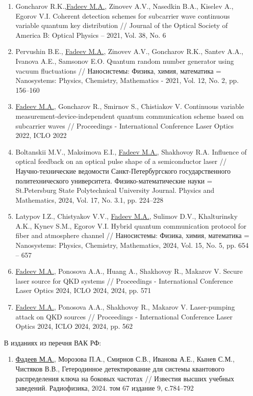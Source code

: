 \begin{enumerate}
    \item Goncharov R.K.,\underline{Fadeev M.A.}, Zinovev A.V., Nasedkin B.A., Kiselev A., Egorov V.I. Coherent detection schemes for subcarrier wave continuous variable quantum key distribution // Journal of the Optical Society of America B: Optical Physics -- 2021, Vol. 38, No. 6
    \item Pervushin B.E., \underline{Fadeev M.A.}, Zinovev A.V., Goncharov R.K., Santev A.A., Ivanova A.E., Samsonov E.O. Quantum random number generator using vacuum fluctuations // Наносистемы: Физика, химия, математика = Nanosystems: Physics, Chemistry, Mathematics - 2021, Vol. 12, No. 2, pp. 156--160
    \item \underline{Fadeev M.A.}, Goncharov R., Smirnov S., Chistiakov V. Continuous variable measurement-device-independent quantum communication scheme based on subcarrier waves // Proceedings - International Conference Laser Optics 2022, ICLO 2022
    \item Boltanskii M.V., Maksimova E.I., \underline{Fadeev M.A.}, Shakhovoy R.A. Influence of optical feedback on an optical pulse shape of a semiconductor laser // Научно-технические ведомости Санкт-Петербургского государственного политехнического университета. Физико-математические науки = St.Petersburg State Polytechnical University Journal. Physics and Mathematics, 2024, Vol. 17, No. 3.1, pp. 224--228
    \item Latypov I.Z., Chistyakov V.V., \underline{Fadeev M.A.}, Sulimov D.V., Khalturinsky A.K., Kynev S.M., Egorov V.I. Hybrid quantum communication protocol for fiber and atmosphere channel // Наносистемы: Физика, химия, математика = Nanosystems: Physics, Chemistry, Mathematics, 2024, Vol. 15, No. 5, pp. 654 -- 657
    \item \underline{Fadeev M.A.}, Ponosova A.A., Huang A., Shakhovoy R., Makarov V. Secure laser source for QKD systems // Proceedings - International Conference Laser Optics 2024, ICLO 2024, 2024, pp. 571
    \item \underline{Fadeev M.A.}, Ponosova A.A., Shakhovoy R., Makarov V. Laser-pumping attack on QKD sources // Proceedings - International Conference Laser Optics 2024, ICLO 2024, 2024, pp. 562
\end{enumerate}

В изданиях из перечня ВАК РФ: 
\begin{enumerate}
    \item \underline{Фадеев М.А.}, Морозова П.А., Смирнов С.В., Иванова А.Е., Кынев С.М., Чистяков В.В., Гетеродинное детектирование для системы квантового распределения ключа на боковых частотах // Известия высших учебных заведений. Радиофизика, 2024. том 67 издание 9, с.784--792
\end{enumerate}

